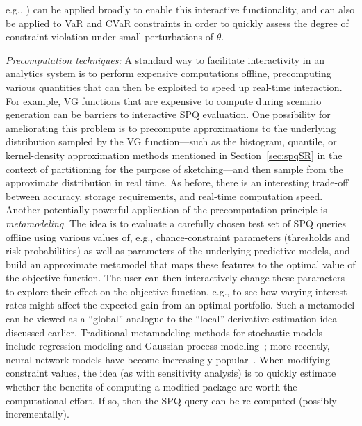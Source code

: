 \documentclass[11pt]{article}
\begin{document}
e.g., \cite{peng2018new}) can be applied broadly to enable this interactive functionality, and can also be applied to VaR and CVaR constraints in order to quickly assess the degree of constraint violation under small perturbations of $\theta$.

\smallskip\textit{Precomputation techniques:} A standard way to facilitate interactivity in an analytics system is to perform expensive computations offline, precomputing various quantities that can then be exploited to speed up real-time interaction.
For example, VG functions that are expensive to compute during scenario generation can be barriers to interactive SPQ evaluation. One possibility for ameliorating this problem is to precompute approximations to the underlying distribution sampled by the VG function---such as the histogram, quantile, or kernel-density approximation methods mentioned in Section~\ref{sec:spqSR} in the context of partitioning for the purpose of sketching---and then sample from the approximate distribution in real time. As before, there is an interesting trade-off between accuracy, storage requirements, and real-time computation speed. Another potentially powerful application of the precomputation principle is \emph{metamodeling}. The idea is to evaluate a carefully chosen test set of SPQ queries offline using various values of, e.g., chance-constraint parameters (thresholds and risk probabilities) as well as parameters of the underlying predictive models, and build an approximate metamodel that maps these features to the optimal value of the objective function. The user can then interactively change these parameters to explore their effect on the objective function, e.g., to see how varying interest rates might affect the expected gain from an optimal portfolio. Such a metamodel can be viewed as a ``global'' analogue to the ``local'' derivative estimation idea discussed earlier. Traditional metamodeling methods for stochastic models include regression modeling and Gaussian-process modeling~\cite{barton2020tutorial}; more recently, neural network models have become increasingly popular~\cite{CenH22,Lam2021neural}. When modifying constraint values, the idea (as with sensitivity analysis) is to quickly estimate whether the benefits of computing a modified package are worth the computational effort. If so, then the SPQ query can be re-computed (possibly incrementally).

     
\end{document}

